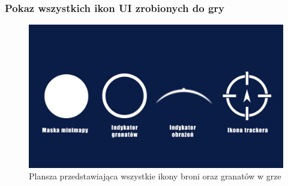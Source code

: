 \subsubsection{Pokaz wszystkich ikon UI zrobionych do gry}

\begin{figure}[h]
    \centering
    \includegraphics[scale=0.2]{Images/Pokazaniegranatow.jpg}
    \caption{Plansza przedstawiająca wszystkie ikony broni oraz granatów w grze}
\end{figure}
\newpage
